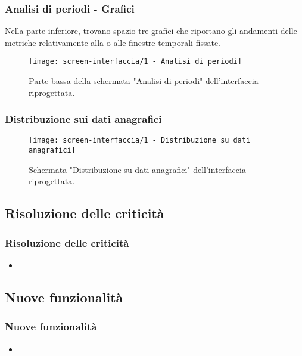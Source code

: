 \documentclass[../../main.tex]{subfiles}
\begin{document}
\begin{frame}
    \frametitle{Analisi di periodi - Grafici}
    Nella parte inferiore, trovano spazio tre grafici che riportano gli andamenti delle metriche relativamente alla o alle finestre temporali fissate.
    \begin{figure}
        \centering
        \texttt{[image: screen-interfaccia/1 - Analisi di periodi]}
        \caption{Parte bassa della schermata "Analisi di periodi" dell'interfaccia riprogettata.}
    \end{figure}    

\end{frame}

\begin{frame}
    \frametitle{Distribuzione sui dati anagrafici}
    \label{distribuzione}
    \begin{figure}
        \centering
        \texttt{[image: screen-interfaccia/1 - Distribuzione su dati anagrafici]}
        \caption{Schermata "Distribuzione su dati anagrafici" dell'interfaccia riprogettata.}
    \end{figure}    

\end{frame}

\subsection{Risoluzione delle criticità}

\begin{frame}
    \frametitle{Risoluzione delle criticità}

    \begin{itemize}
        \item
    \end{itemize}    

\end{frame}

\subsection{Nuove funzionalità}

\begin{frame}
    \frametitle{Nuove funzionalità}

    \begin{itemize}
        \item          

    \end{itemize}

\end{frame}
\end{document}
